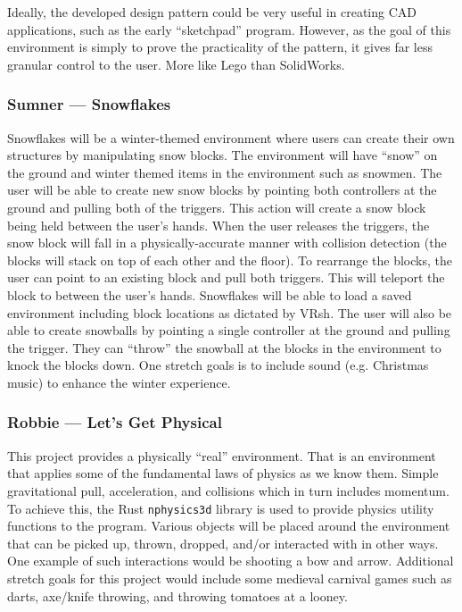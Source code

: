 \documentclass[titlepage,12pt]{article}
\begin{document}
Ideally, the developed design pattern could be very useful in creating CAD
applications, such as the early ``sketchpad'' program. However, as the goal of
this environment is simply to prove the practicality of the pattern, it gives
far less granular control to the user. More like Lego than SolidWorks.

\subsubsection{Sumner --- Snowflakes}
Snowflakes will be a winter-themed environment where users can create their own
structures by manipulating snow blocks. The environment will have ``snow'' on
the ground and winter themed items in the environment such as snowmen. The user
will be able to create new snow blocks by pointing both controllers at the
ground and pulling both of the triggers. This action will create a snow block
being held between the user's hands. When the user releases the triggers, the
snow block will fall in a physically-accurate manner with collision detection
(the blocks will stack on top of each other and the floor). To rearrange the
blocks, the user can point to an existing block and pull both triggers. This
will teleport the block to between the user's hands. Snowflakes will be able to
load a saved environment including block locations as dictated by VRsh. The user
will also be able to create snowballs by pointing a single controller at the
ground and pulling the trigger. They can ``throw'' the snowball at the blocks in
the environment to knock the blocks down. One stretch goals is to include sound
(e.g. Christmas music) to enhance the winter experience.

\subsubsection{Robbie --- Let's Get Physical}
This project provides a physically ``real'' environment.  That is an environment
that applies some of the fundamental laws of physics as we know them. Simple
gravitational pull, acceleration, and collisions which in turn includes
momentum. To achieve this, the Rust \texttt{nphysics3d} library is used to
provide physics utility functions to the program.  Various objects will be
placed around the environment that can be picked up, thrown, dropped, and/or
interacted with in other ways. One example of such interactions would be
shooting a bow and arrow. Additional stretch goals for this project would include
some medieval carnival games such as darts, axe/knife throwing, and throwing 
tomatoes at a looney.
\end{document}
